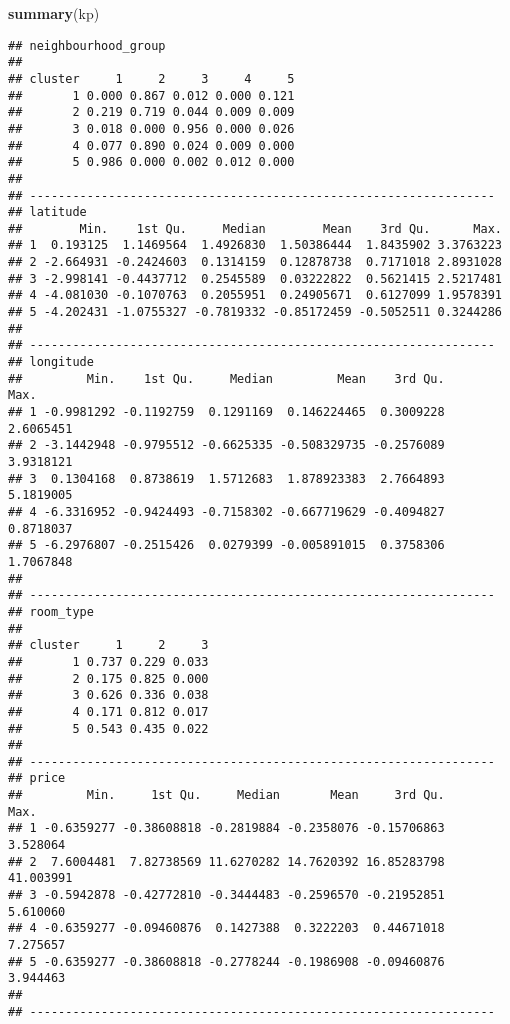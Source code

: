 \documentclass[
]{article}
\newenvironment{Shaded}{\begin{snugshade}}{\end{snugshade}}
\newcommand{\KeywordTok}[1]{\textcolor[rgb]{0.13,0.29,0.53}{\textbf{#1}}}
\newcommand{\NormalTok}[1]{#1}
\begin{document}
\begin{Shaded}
\begin{Highlighting}[]
\KeywordTok{summary}\NormalTok{(kp)}
\end{Highlighting}
\end{Shaded}

\begin{verbatim}
## neighbourhood_group 
##        
## cluster     1     2     3     4     5
##       1 0.000 0.867 0.012 0.000 0.121
##       2 0.219 0.719 0.044 0.009 0.009
##       3 0.018 0.000 0.956 0.000 0.026
##       4 0.077 0.890 0.024 0.009 0.000
##       5 0.986 0.000 0.002 0.012 0.000
## 
## -----------------------------------------------------------------
## latitude 
##        Min.    1st Qu.     Median        Mean    3rd Qu.      Max.
## 1  0.193125  1.1469564  1.4926830  1.50386444  1.8435902 3.3763223
## 2 -2.664931 -0.2424603  0.1314159  0.12878738  0.7171018 2.8931028
## 3 -2.998141 -0.4437712  0.2545589  0.03222822  0.5621415 2.5217481
## 4 -4.081030 -0.1070763  0.2055951  0.24905671  0.6127099 1.9578391
## 5 -4.202431 -1.0755327 -0.7819332 -0.85172459 -0.5052511 0.3244286
## 
## -----------------------------------------------------------------
## longitude 
##         Min.    1st Qu.     Median         Mean    3rd Qu.      Max.
## 1 -0.9981292 -0.1192759  0.1291169  0.146224465  0.3009228 2.6065451
## 2 -3.1442948 -0.9795512 -0.6625335 -0.508329735 -0.2576089 3.9318121
## 3  0.1304168  0.8738619  1.5712683  1.878923383  2.7664893 5.1819005
## 4 -6.3316952 -0.9424493 -0.7158302 -0.667719629 -0.4094827 0.8718037
## 5 -6.2976807 -0.2515426  0.0279399 -0.005891015  0.3758306 1.7067848
## 
## -----------------------------------------------------------------
## room_type 
##        
## cluster     1     2     3
##       1 0.737 0.229 0.033
##       2 0.175 0.825 0.000
##       3 0.626 0.336 0.038
##       4 0.171 0.812 0.017
##       5 0.543 0.435 0.022
## 
## -----------------------------------------------------------------
## price 
##         Min.     1st Qu.     Median       Mean     3rd Qu.      Max.
## 1 -0.6359277 -0.38608818 -0.2819884 -0.2358076 -0.15706863  3.528064
## 2  7.6004481  7.82738569 11.6270282 14.7620392 16.85283798 41.003991
## 3 -0.5942878 -0.42772810 -0.3444483 -0.2596570 -0.21952851  5.610060
## 4 -0.6359277 -0.09460876  0.1427388  0.3222203  0.44671018  7.275657
## 5 -0.6359277 -0.38608818 -0.2778244 -0.1986908 -0.09460876  3.944463
## 
## -----------------------------------------------------------------
\end{verbatim}
\end{document}
